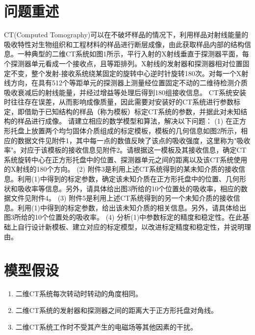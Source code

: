 \documentclass[bwprint]{cumcmthesis}
\begin{document}
\section{问题重述}
CT(Computed Tomography)可以在不破坏样品的情况下，利用样品对射线能量的吸收特性对生物组织和工程材料的样品进行断层成像，由此获取样品内部的结构信息。一种典型的二维CT系统如图1所示，平行入射的X射线垂直于探测器平面，每个探测器单元看成一个接收点，且等距排列。X射线的发射器和探测器相对位置固定不变，整个发射-接收系统绕某固定的旋转中心逆时针旋转180次。对每一个X射线方向，在具有512个等距单元的探测器上测量经位置固定不动的二维待检测介质吸收衰减后的射线能量，并经过增益等处理后得到180组接收信息。
CT系统安装时往往存在误差，从而影响成像质量，因此需要对安装好的CT系统进行参数标定，即借助于已知结构的样品（称为模板）标定CT系统的参数，并据此对未知结构的样品进行成像。
请建立相应的数学模型和算法，解决以下问题：
(1) 在正方形托盘上放置两个均匀固体介质组成的标定模板，模板的几何信息如图2所示，相应的数据文件见附件1，其中每一点的数值反映了该点的吸收强度，这里称为"吸收率"。对应于该模板的接收信息见附件2。请根据这一模板及其接收信息，确定CT系统旋转中心在正方形托盘中的位置、探测器单元之间的距离以及该CT系统使用的X射线的180个方向。
(2) 附件3是利用上述CT系统得到的某未知介质的接收信息。利用(1)中得到的标定参数，确定该未知介质在正方形托盘中的位置、几何形状和吸收率等信息。另外，请具体给出图3所给的10个位置处的吸收率，相应的数据文件见附件4。
(3) 附件5是利用上述CT系统得到的另一个未知介质的接收信息。利用(1)中得到的标定参数，给出该未知介质的相关信息。另外，请具体给出图3所给的10个位置处的吸收率。
(4) 分析(1)中参数标定的精度和稳定性。在此基础上自行设计新模板、建立对应的标定模型，以改进标定精度和稳定性，并说明理由。

\section{模型假设}
\begin{enumerate}
	\item 二维CT系统每次转动时转动的角度相同。
	\item 二维CT系统的发射器和探测器之间的距离大于正方形托盘对角线。
	\item 二维CT系统工作时不受其产生的电磁场等其他因素的干扰。
\end{enumerate}
\end{document}
